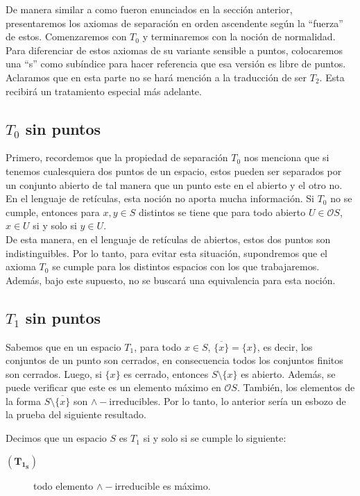 \documentclass{comunicaciones}
\begin{document}
De manera similar a como fueron enunciados en la sección anterior, presentaremos los axiomas de separación en orden ascendente según la ``fuerza'' de estos. Comenzaremos con $T_0$ y terminaremos con la noción de normalidad. Para diferenciar de estos axiomas de su variante sensible a puntos, colocaremos una ``s'' como subíndice para hacer referencia que esa versión es libre de puntos. Aclaramos que en esta parte no se hará mención a la traducción de ser $T_2$. Esta recibirá un tratamiento especial más adelante.

\subsection{$T_0$ sin puntos}

Primero, recordemos que la propiedad de separación $T_0$ nos menciona que si tenemos cualesquiera dos puntos de un espacio, estos pueden ser separados por un conjunto abierto de tal manera que un punto este en el abierto y el otro no. En el lenguaje de retículas, esta noción no aporta mucha información. Si $T_0$ no se cumple, entonces para $x, y\in S$ distintos se tiene que para todo abierto $U\in \mathcal{O}S$, $x\in U$ si y solo si $y\in U$.\\

De esta manera, en el lenguaje de retículas de abiertos, estos dos puntos son indistinguibles. Por lo tanto, para evitar esta situación, supondremos que el axioma $T_0$ se cumple para los distintos espacios con los que trabajaremos. Además, bajo este supuesto, no se buscará una equivalencia para esta noción.

\subsection{$T_1$ sin puntos}\label{T1s}

Sabemos que en un espacio $T_1$, para todo $x\in S$, $\overline{\{x\}}=\{x\}$, es decir, los conjuntos de un punto son cerrados, en consecuencia todos los conjuntos finitos son cerrados. Luego, si $\{x\}$ es cerrado, entonces $S\setminus \{x\}$ es abierto. Además, se puede verificar que este es un elemento máximo en $\mathcal{O}S$. También, los elementos de la forma $S\setminus \overline{\{x\}}$ son $\wedge-$irreducibles. Por lo tanto, lo anterior sería un esbozo de la prueba del siguiente resultado.
\begin{prop}\label{T1s} 
Decimos que un espacio $S$ es $T_1$ si y solo si se cumple lo siguiente:
\begin{description}
\item[$(\mathbf{T_{1_S}})$] todo elemento $\wedge-$irreducible es máximo.
\end{description}
\end{prop}
\end{document}
